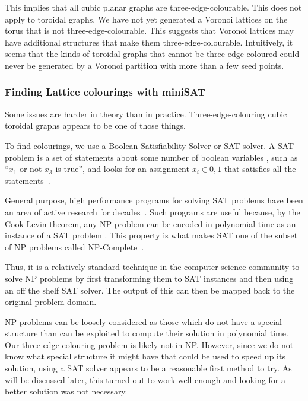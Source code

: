 This implies that all cubic planar graphs are three-edge-colourable. This does not apply to toroidal graphs. We have not yet generated a Voronoi lattices on the torus that is not three-edge-colourable. This suggests that Voronoi lattices may have additional structures that make them three-edge-colourable. Intuitively, it seems that the kinds of toroidal graphs that cannot be three-edge-coloured could never be generated by a Voronoi partition with more than a few seed points.

\hypertarget{finding-lattice-colourings-with-minisat}{%
\subsubsection{Finding Lattice colourings with miniSAT}\label{finding-lattice-colourings-with-minisat}}

Some issues are harder in theory than in practice. Three-edge-colouring cubic toroidal graphs appears to be one of those things.

To find colourings, we use a Boolean Satisfiability Solver or SAT solver. A SAT problem is a set of statements about some number of boolean variables , such as ``\(x_1\) or not \(x_3\) is true'', and looks for an assignment \(x_i \in {0,1}\) that satisfies all the statements~\autocite{Karp1972}.

General purpose, high performance programs for solving SAT problems have been an area of active research for decades~\autocite{alounehComprehensiveStudyAnalysis2019}. Such programs are useful because, by the Cook-Levin theorem, any NP problem can be encoded in polynomial time as an instance of a SAT problem . This property is what makes SAT one of the subset of NP problems called NP-Complete~\autocite{cookComplexityTheoremprovingProcedures1971,levin1973universal}.

Thus, it is a relatively standard technique in the computer science community to solve NP problems by first transforming them to SAT instances and then using an off the shelf SAT solver. The output of this can then be mapped back to the original problem domain.

NP problems can be loosely considered as those which do not have a special structure than can be exploited to compute their solution in polynomial time. Our three-edge-colouring problem is likely not in NP. However, since we do not know what special structure it might have that could be used to speed up its solution, using a SAT solver appears to be a reasonable first method to try. As will be discussed later, this turned out to work well enough and looking for a better solution was not necessary.

